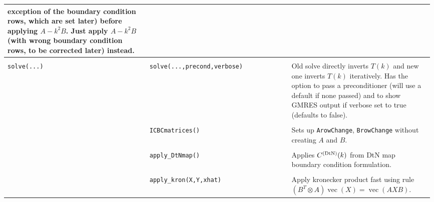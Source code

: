 \begin{center}
\begin{longtable}{p{0.33\linewidth} p{0.33\linewidth} p{0.33\linewidth}}
                         exception of the boundary condition rows,
                         which are set later)
                         before
                         applying $A - k^2 B$. Just apply
                         $A - k^2 B$ (with wrong boundary condition rows,
                         to be corrected later)
                         instead. \\ \hline \\ 
{\tt solve(...)}   & {\tt solve(...,precond,verbose)}
                       & Old solve directly inverts $T(k)$
                         and new one inverts $T(k)$ iteratively.
                         Has the option to pass a 
                         preconditioner (will use a default if none
                         passed) and to show GMRES output if verbose
                         set to true (defaults to false). \\ \hline \\ 
                       & {\tt ICBCmatrices()} 
                       & Sets up {\tt ArowChange}, 
                         {\tt BrowChange} without
                         creating $A$ and $B$. \\ \hline \\ 
                       & {\tt apply\_DtNmap()} 
                       & Applies $C^{(\text{DtN})}(k)$ from DtN map
                         boundary condition formulation. \\ \hline \\ 
                       & {\tt apply\_kron(X,Y,xhat)} 
                       & Apply kronecker product
                         fast using rule $(B^T \otimes A)
                         \operatorname{vec}(X) = 
                         \operatorname{vec}(AXB)$. \\ 
\end{longtable}
\end{center}
